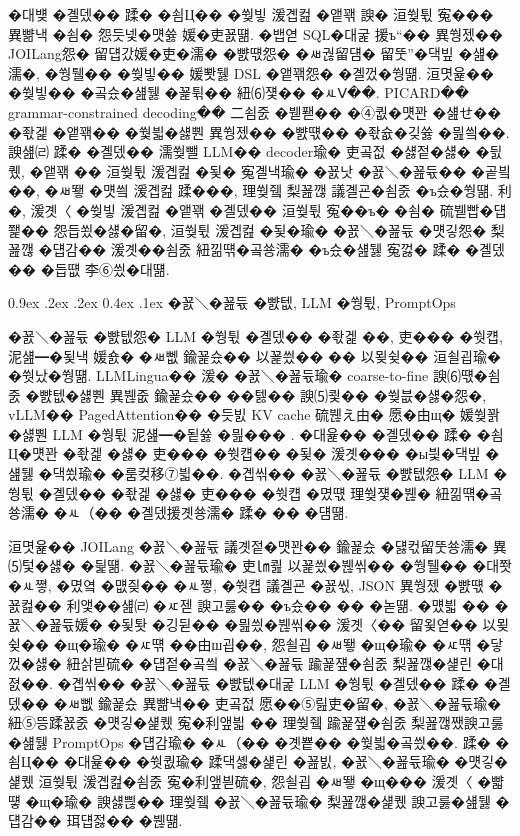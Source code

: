\documentclass[10pt,twocolumn]{article}
\makeatletter
\renewcommand{\subsection}{\@startsection{subsection}{2}{\z@}%
{0.9ex \@plus .2ex \@minus .2ex}%
{0.4ex \@plus .1ex}%
{\normalfont\normalsize\bfseries}}
\makeatother
\begin{document}
�대뱾 �곌뎄�� 蹂� �쇰Ц�� �쒖빟 湲곕컲 �앹꽦 諛� 洹쒖튃 寃��� 異뺢낵 �쇰� 怨듯넻�먯쓣 媛�吏꾨떎. �뱁엳 SQL�대굹 援ъ“�� 異쒕젰�� JOILang怨� 留덉갔媛�吏�濡� �뺤떇怨� �ㅽ궎留덈� 留뚯”�댁빞 �섎�濡�, �쒕퉬�� �쒖빟�� 媛뽯뒗 DSL �앹꽦怨� �곌껐�쒕떎. 洹몃윭�� �쒖빟�� �곸슜�섎뒗 �꾩튂�� 紐⑹쟻�� �ㅻⅤ��. PICARD�� grammar-constrained decoding�� 二쇰줈 �붿퐫�� �④퀎�먯꽌 �섎せ�� �좏겙 �앹꽦�� �쒗븳�섏뿬 異쒕젰�� �뺤떇�� �좏슚�깆쓣 �믪씤��. 諛섎㈃ 蹂� �곌뎄�� 濡쒖뺄 LLM�� decoder瑜� 吏곸젒 �섏젙�섏� �딄퀬, �앹꽦 �� 洹쒖튃 湲곕컲 �됯� 寃곌낵瑜� �꾨낫 �꾨＼�꾪듃�� �곹빀��, �ㅽ뙣 �먯씤 湲곕컲 蹂���, 理쒖쥌 梨꾪깮 議곌굔�쇰줈 �ъ슜�쒕떎. 利�, 湲곗〈 �쒖빟 湲곕컲 �앹꽦 �곌뎄�� 洹쒖튃 寃��ъ� �쇰� 硫붿빱�덉쬁�� 怨듭쑀�섏�留�, 洹쒖튃 湲곕컲 �됯�瑜� �꾨＼�꾪듃 �먯깋怨� 梨꾪깮 �덉감�� 湲곗��쇰줈 紐낆떆�곸쑝濡� �ъ슜�섎뒗 寃껋� 蹂� �곌뎄�� �듭떖 李⑥씠�대떎.

\subsection{�꾨＼�꾪듃 �뺤텞, LLM �쒕튃, PromptOps}

�꾨＼�꾪듃 �뺤텞怨� LLM �쒕튃 �곌뎄�� �좏겙 ��, 吏��� �쒓컙, 泥섎━�됯낵 媛숈� �ㅽ뻾 鍮꾩슜�� 以꾩씠�� �� 以묒슂�� 洹쇨굅瑜� �쒓났�쒕떎. LLMLingua�� 湲� �꾨＼�꾪듃瑜� coarse-to-fine 諛⑹떇�쇰줈 �뺤텞�섏뿬 異붾줎 鍮꾩슜�� ��텛�� 諛⑸쾿�� �쒖븞�섏�怨�, vLLM�� PagedAttention�� �듯빐 KV cache 硫붾え由� 愿�由щ� 媛쒖꽑�섏뿬 LLM �쒕튃 泥섎━�됱쓣 �믪��� \cite{REF_LLMLINGUA,REF_VLLM}. �대윭�� �곌뎄�� 蹂� �쇰Ц�먯꽌 �좏겙 �섏� 吏��� �쒓컙�� �됯� 湲곗��� �ы븿�댁빞 �섎뒗 �댁쑀瑜� �룸컺移⑦븳��. �곕씪�� �꾨＼�꾪듃 �뺤텞怨� LLM �쒕튃 �곌뎄�� �좏겙 �섏� 吏��� �쒓컙 �몄떇 理쒖쟻�붾� 紐낆떆�곸쑝濡� �ㅻ（�� �곌뎄援곗쑝濡� 蹂� �� �덈떎.

洹몃윭�� JOILang �꾨＼�꾪듃 議곗젙�먯꽌�� 鍮꾩슜 �덇컧留뚯쑝濡� 異⑸텇�섏� �딅떎. �꾨＼�꾪듃瑜� 吏㏐쾶 以꾩씠�붾씪�� �쒕퉬�� �대쫫 �ㅻ쪟, �몄옄 �먮즺�� �ㅻ쪟, �쒓컙 議곌굔 �꾨씫, JSON 異쒕젰 �뺤떇 �꾨컲�� 利앷��섎㈃ �ㅼ젣 諛고룷�� �ъ슜�� �� �녿떎. �먰븳 �� �꾨＼�꾪듃媛� �됯퇏 �깅뒫�� �믪씠�붾씪�� 湲곗〈�� 留욏엳�� 以묒슂�� �щ�瑜� �ㅼ떆 ��由ш굅��, 怨쇨굅 �ㅽ뙣 �щ�瑜� �ㅼ떆 �닿껐�섏� 紐삵븯硫� �덉젙�곸씤 �꾨＼�꾪듃 踰꾩쟾�쇰줈 梨꾪깮�섍린 �대졄��. �곕씪�� �꾨＼�꾪듃 �뺤텞�대굹 LLM �쒕튃 �곌뎄�� 蹂� �곌뎄�� �ㅽ뻾 鍮꾩슜 異뺢낵�� 吏곸젒 愿��⑤릺吏�留�, �꾨＼�꾪듃瑜� 紐⑤뜽蹂꾨줈 �먯깋�섍퀬 寃�利앺븳 �� 理쒖쥌 踰꾩쟾�쇰줈 梨꾪깮쨌諛고룷�섎뒗 PromptOps �덉감瑜� �ㅻ（�� �곗뿉�� �쒗븳�곸씠��. 蹂� �쇰Ц�� �대윭�� �쒓퀎瑜� 蹂댁셿�섍린 �꾪빐, �꾨＼�꾪듃瑜� �먯깋�섍퀬 洹쒖튃 湲곕컲�쇰줈 寃�利앺븯硫�, 怨쇨굅 �ㅽ뙣 �щ��� 湲곗〈 �뺣떟 �щ�瑜� 諛섏쁺�� 理쒖쥌 �꾨＼�꾪듃瑜� 梨꾪깮�섍퀬 諛고룷�섎뒗 �덉감�� 珥덉젏�� �붾떎.
\end{document}
